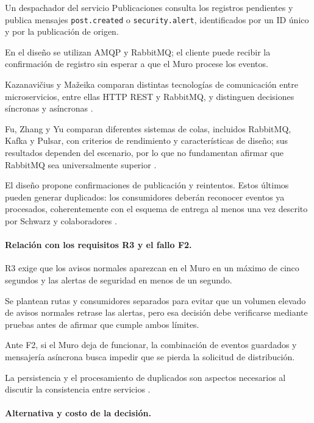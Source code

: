 \documentclass[12pt,a4paper]{article}
\begin{document}
Un despachador del servicio Publicaciones consulta los registros pendientes y publica mensajes \texttt{post.created} o \texttt{security.alert}, identificados por un ID único y por la publicación de origen.

En el diseño se utilizan AMQP y RabbitMQ; el cliente puede recibir la confirmación de registro sin esperar a que el Muro procese los eventos.

Kazanavičius y Mažeika comparan distintas tecnologías de comunicación entre microservicios, entre ellas HTTP REST y RabbitMQ, y distinguen decisiones síncronas y asíncronas \cite{kazanavicius2023communication}.

Fu, Zhang y Yu comparan diferentes sistemas de colas, incluidos RabbitMQ, Kafka y Pulsar, con criterios de rendimiento y características de diseño; sus resultados dependen del escenario, por lo que no fundamentan afirmar que RabbitMQ sea universalmente superior \cite{fu2021brokers}.

El diseño propone confirmaciones de publicación y reintentos. Estos últimos pueden generar duplicados: los consumidores deberán reconocer eventos ya procesados, coherentemente con el esquema de entrega al menos una vez descrito por Schwarz y colaboradores \cite{schwarz2025outbox}.

\paragraph{Relación con los requisitos R3 y el fallo F2.}

R3 exige que los avisos normales aparezcan en el Muro en un máximo de cinco segundos y las alertas de seguridad en menos de un segundo.

Se plantean rutas y consumidores separados para evitar que un volumen elevado de avisos normales retrase las alertas, pero esa decisión debe verificarse mediante pruebas antes de afirmar que cumple ambos límites.

Ante F2, si el Muro deja de funcionar, la combinación de eventos guardados y mensajería asíncrona busca impedir que se pierda la solicitud de distribución.

La persistencia y el procesamiento de duplicados son aspectos necesarios al discutir la consistencia entre servicios \cite{bacao2026consistency,schwarz2025outbox}.

\paragraph{Alternativa y costo de la decisión.}
\end{document}
